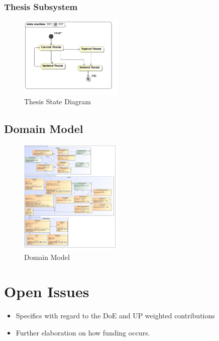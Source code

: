 \documentclass{article}
\begin{document}
			\subsubsection{Thesis Subsystem}
				\begin{figure}[h!]
					\centerline{\includegraphics[width=186px]{5.4-SS5-7/SS7}}
					\caption{Thesis State Diagram}
				\end{figure}
				\newpage
		\subsection{Domain Model}
			\begin{figure}[h!]
				\centerline{\includegraphics[width=186px]{DomainModel/DomainModel}}
					\caption{Domain Model}
			\end{figure}
	\section{Open Issues}
	\begin{itemize}
		\item Specifics with regard to the DoE and UP weighted contributions
		\item Further elaboration on how funding occurs.
	\end{itemize}
\end{document}
